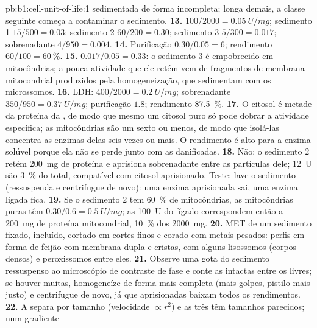 \begin{solution}{pb:b1:cell-unit-of-life:1}
sedimentada de forma incompleta; longa demais, a classe seguinte começa
a contaminar o sedimento.
\textbf{13.}  $100/2000 = \qty{0.05}{U/mg}$; sedimento 1
$15/500 = 0.03$; sedimento 2 $60/200 = 0.30$; sedimento 3
$5/300 = 0.017$; sobrenadante $4/950 = 0.004$.
\textbf{14.} Purificação $0.30/0.05 = 6$; rendimento $60/100 =
\qty{60}{\%}$.
\textbf{15.} $0.017/0.05 = 0.33$: o sedimento 3 é empobrecido em mitocôndrias; a pouca atividade que ele retém vem de fragmentos de membrana mitocondrial produzidos pela homogeneização, que sedimentam com os microssomos.
\textbf{16.} LDH:  $400/2000 = \qty{0.2}{U/mg}$;
sobrenadante $350/950 = \qty{0.37}{U/mg}$; purificação $1.8$; rendimento
\qty{87.5}{\%}.
\textbf{17.} O citosol é metade da proteína da , de modo que mesmo
um citosol puro só pode dobrar a atividade específica; as mitocôndrias
são um sexto ou menos, de modo que isolá-las concentra as enzimas delas
seis vezes ou mais. O rendimento é alto para a enzima solúvel porque ela
não se perde junto com as  danificadas.
\textbf{18.} Não: o sedimento 2 retém \qty{200}{mg} de proteína e
aprisiona sobrenadante entre as partículas dele; \qty{12}{U} são
\qty{3}{\%} do total, compatível com citosol aprisionado. Teste: lave o
sedimento (ressuspenda e centrifugue de novo): uma enzima aprisionada
sai, uma enzima ligada fica.
\textbf{19.} Se o sedimento 2 tem \qty{60}{\%} de mitocôndrias, as
mitocôndrias puras têm $0.30/0.6 = \qty{0.5}{U/mg}$; as \qty{100}{U} do
fígado correspondem então a \qty{200}{mg} de proteína mitocondrial,
\qty{10}{\%} dos \qty{2000}{mg}.
\textbf{20.} MET de um sedimento fixado, incluído, cortado em cortes
finos e corado com metais pesados: perfis em forma de feijão com membrana
dupla e cristas, com alguns lisossomos (corpos densos) e peroxissomos
entre eles.
\textbf{21.} Observe uma gota do sedimento ressuspenso ao microscópio de contraste de fase e conte as  intactas entre os  livres; se houver muitas, homogeneíze de forma mais completa (mais golpes, pistilo mais justo) e centrifugue de novo, já que  aprisionadas baixam todos os rendimentos.
\textbf{22.} A  separa por tamanho (velocidade
$\propto r^2$) e as três  têm tamanhos parecidos; num gradiente

\end{solution}

